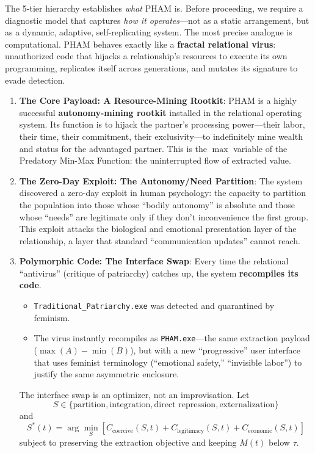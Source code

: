 \documentclass[12pt,openany]{book}
\numberwithin{equation}{chapter}
\begin{document}
The 5-tier hierarchy establishes \textit{what} PHAM is. Before proceeding, we require a diagnostic model that captures \textit{how it operates}---not as a static arrangement, but as a dynamic, adaptive, self-replicating system. The most precise analogue is computational. PHAM behaves exactly like a \textbf{fractal relational virus}: unauthorized code that hijacks a relationship's resources to execute its own programming, replicates itself across generations, and mutates its signature to evade detection.

\begin{enumerate}
    \item \textbf{The Core Payload: A Resource-Mining Rootkit}: PHAM is a highly successful \textbf{autonomy-mining rootkit} installed in the relational operating system. Its function is to hijack the partner's processing power---their labor, their time, their commitment, their exclusivity---to indefinitely mine wealth and status for the advantaged partner. This is the $\max$ variable of the Predatory Min-Max Function: the uninterrupted flow of extracted value.
    
    \item \textbf{The Zero-Day Exploit: The Autonomy/Need Partition}: The system discovered a zero-day exploit in human psychology: the capacity to partition the population into those whose ``bodily autonomy'' is absolute and those whose ``needs'' are legitimate only if they don't inconvenience the first group. This exploit attacks the biological and emotional presentation layer of the relationship, a layer that standard ``communication updates'' cannot reach.
    
    \item \textbf{Polymorphic Code: The Interface Swap}: Every time the relational ``antivirus'' (critique of patriarchy) catches up, the system \textbf{recompiles its code}. 
    \begin{itemize}
        \item \texttt{Traditional\_Patriarchy.exe} was detected and quarantined by feminism. 
        \item The virus instantly recompiles as \texttt{PHAM.exe}---the same extraction payload ($\max(A) - \min(B)$), but with a new ``progressive'' user interface that uses feminist terminology (``emotional safety,'' ``invisible labor'') to justify the same asymmetric enclosure.
    \end{itemize}
    
    The interface swap is an optimizer, not an improvisation. Let
    \begin{equation}\label{eq:interface-strategy-set}
    S \in \{\text{partition},\text{integration},\text{direct repression},\text{externalization}\}
    \end{equation}
    and
    \begin{equation}\label{eq:interface-optimizer}
    S^*(t) = \arg\min_{S} \left[C_{\text{coercive}}(S,t) + C_{\text{legitimacy}}(S,t) + C_{\text{economic}}(S,t)\right]
    \end{equation}
    subject to preserving the extraction objective and keeping $M(t)$ below $\tau$.
    

\end{enumerate}
\end{document}
